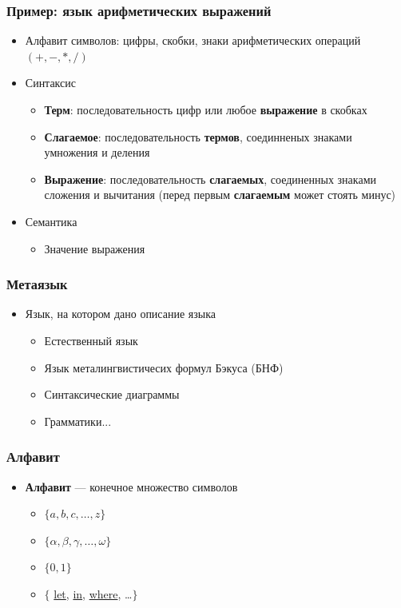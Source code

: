 \documentclass{beamer}
\begin{document}
\begin{frame}[fragile]
  \transwipe[direction=90]
  \frametitle{Пример: язык арифметических выражений}
  \begin{itemize}
    \item Алфавит символов: цифры, скобки, знаки арифметических операций $(+, -, *, /)$
    \item Синтаксис
    \begin{itemize}
      \item \textbf{Терм}: последовательность цифр или любое \textbf{выражение} в скобках
      \item \textbf{Слагаемое}: последовательность \textbf{термов}, соединненых знаками умножения и деления
      \item \textbf{Выражение}: последовательность \textbf{слагаемых}, соединенных знаками сложения и вычитания (перед первым \textbf{слагаемым} может стоять минус)
    \end{itemize}
    \item Семантика
    \begin{itemize}
      \item Значение выражения
    \end{itemize}
  \end{itemize}
\end{frame}

\begin{frame}[fragile]
  \transwipe[direction=90]
  \frametitle{Метаязык}
  \begin{itemize}
    \item Язык, на котором дано описание языка
    \begin{itemize}
      \item Естественный язык
      \pause
      \item Язык металингвистичесих формул Бэкуса (БНФ)
      \pause \item Синтаксические диаграммы
      \pause \item Грамматики...
    \end{itemize}
  \end{itemize}
\end{frame}

\begin{frame}[fragile]
  \transwipe[direction=90]
  \frametitle{Алфавит}
  \begin{itemize}
    \item \textbf{Алфавит} --- конечное множество символов
    \begin{itemize}
      \item $\{ a, b, c, \dots, z \}$
      \item $\{ \alpha, \beta, \gamma, \dots, \omega \}$
      \item $\{ 0, 1 \}$
      \item $\{$ \underline{let}, \underline{in}, \underline{where}, \dots $\}$
    \end{itemize}    
  \end{itemize}
\end{frame}
\end{document}
